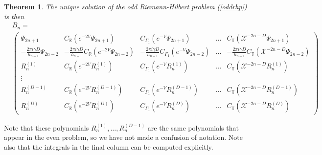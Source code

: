 \documentclass[12pt]{article}
\newtheorem{theorem}{Theorem}[section]
\theoremstyle{definition}
\begin{document}
\begin{theorem}
The unique solution of the \textit{odd} Riemann-Hilbert problem (\ref{oddrhp}) is then
\begin{equation}
\begin{split}
&B_{n} =  \\
&\left(\begin{matrix}
\Psi_{2n+1} & C_\mathbb{R}(e^{-2V}\Psi_{2n+1}) & C_{\Gamma_1}(e^{-V}\Psi_{2n+1}) & \dots &  C_{\mathbb{T}}(\mathscr{X}^{-2n-D}\Psi_{2n+1})  \\
- \frac{2\pi i \gamma D}{h_{n-1}}\Psi_{2n-2} & - \frac{2\pi i \gamma D}{h_{n-1}} C_\mathbb{R}(e^{-2V}\Psi_{2n-2}) & - \frac{2\pi i \gamma D}{h_{n-1}} C_{\Gamma_1}(e^{-V}\Psi_{2n-2}) & \dots & - \frac{2\pi i \gamma D}{h_{n-1}} C_{\mathbb{T}}(\mathscr{X}^{-2n-D}\Psi_{2n-2}) \\
R^{(1)}_n & C_\mathbb{R}(e^{-2V}R^{(1)}_n) & C_{\Gamma_1}(e^{-V}R^{(1)}_n) & \dots & C_{\mathbb{T}}(\mathscr{X}^{-2n-D}R^{(1)}_n) \\
\vdots \\
R^{(D-1)}_n & C_\mathbb{R}(e^{-2V}R^{(D-1)}_n) & C_{\Gamma_1}(e^{-V}R^{(D-1)}_n) & \dots & C_{\mathbb{T}}(\mathscr{X}^{-2n-D}R^{(D-1)}_n) \\
R^{(D)}_n & C_\mathbb{R}(e^{-2V}R^{(D)}_n) & C_{\Gamma_1}(e^{-V}R^{(D)}_n) & \dots & C_{\mathbb{T}}(\mathscr{X}^{-2n-D} R^{(D)}_n)
\end{matrix}\right)
\end{split}
\end{equation}
\end{theorem}
Note that these polynomials $R^{(1)}_n, \dots, R^{(D-1)}_n$ are the same polynomials that appear in the even problem, so we have not made a confusion of notation.  Note also that the integrals in the final column can be computed explicitly.
\end{document}
